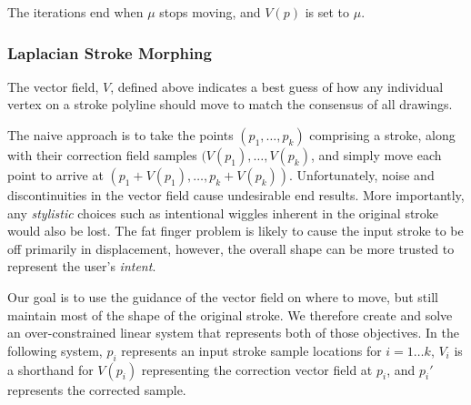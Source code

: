 The iterations end when $\mu$ stops moving, and $V(p)$ is set to $\mu$.

\subsubsection{Laplacian Stroke Morphing}


The vector field, $V$, defined above indicates a best guess of how any individual vertex on a stroke polyline should move to match the consensus of all drawings.

The naive approach is to take the points $(p_1, \ldots, p_k)$ comprising a stroke, along with their correction field samples $(V(p_1), \ldots, V(p_k)$, and simply move each point to arrive at $(p_1 + V(p_1), \ldots, p_k + V(p_k))$.  Unfortunately, noise and discontinuities in the vector field cause undesirable end results. More importantly, any {\em stylistic} choices such as intentional wiggles inherent in the original stroke would also be lost. The fat finger problem is likely to cause the input stroke to be off primarily in displacement, however, the overall shape can be more trusted to represent the user's {\em intent}.

Our goal is to use the guidance of the vector field on where to move, but still maintain most of the shape of the original stroke.  We therefore create and solve an over-constrained linear system that represents both of those objectives.  In the following system, $p_i$ represents an input stroke sample locations for $i=1\ldots k$, $V_i$ is a shorthand for $V(p_i)$ representing the correction vector field at $p_i$, and $p_i'$ represents the corrected sample.

